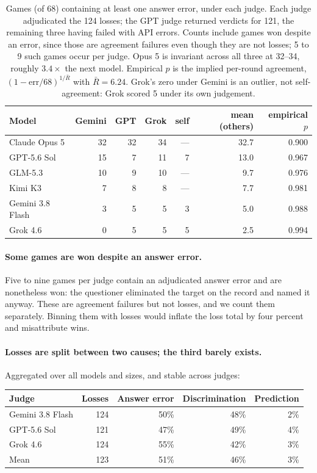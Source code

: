 \documentclass[11pt]{article}
\begin{document}
\begin{table}[h]
\centering\small
\begin{tabular}{lrrrrrr}
\toprule
Model & Gemini & GPT & Grok & self & mean (others) & empirical $p$ \\
\midrule
Claude Opus 5    & 32 & 32 & 34 & --- & 32.7 & 0.900 \\
GPT-5.6 Sol      & 15 &  7 & 11 &  7  & 13.0 & 0.967 \\
GLM-5.3          & 10 &  9 & 10 & --- &  9.7 & 0.976 \\
Kimi K3          &  7 &  8 &  8 & --- &  7.7 & 0.981 \\
Gemini 3.8 Flash &  3 &  5 &  5 &  3  &  5.0 & 0.988 \\
Grok 4.6         &  0 &  5 &  5 &  5  &  2.5 & 0.994 \\
\bottomrule
\end{tabular}
\caption{Games (of 68) containing at least one answer error, under each judge.
Each judge adjudicated the 124 losses; the GPT judge returned verdicts for 121,
the remaining three having failed with API errors.
Counts include games won despite an error, since those are agreement failures
even though they are not losses; 5 to 9 such games occur per judge. Opus 5 is
invariant across all three at 32--34, roughly $3.4\times$ the next model.
Empirical $p$ is the implied per-round agreement,
$(1-\text{err}/68)^{1/\bar{R}}$ with $\bar{R}=6.24$. Grok's zero under Gemini is
an outlier, not self-agreement: Grok scored 5 under its own judgement.}
\end{table}

\paragraph{Some games are won despite an answer error.} Five to nine games per
judge contain an adjudicated answer error and are nonetheless won: the
questioner eliminated the target on the record and named it anyway. These are
agreement failures but not losses, and we count them separately. Binning them
with losses would inflate the
loss total by four percent and misattribute wins.

\paragraph{Losses are split between two causes; the third barely exists.}
Aggregated over all models and sizes, and stable across judges:

\begin{center}\small
\begin{tabular}{lrrrr}
\toprule
Judge & Losses & Answer error & Discrimination & Prediction \\
\midrule
Gemini 3.8 Flash & 124 & 50\% & 48\% & 2\% \\
GPT-5.6 Sol      & 121 & 47\% & 49\% & 4\% \\
Grok 4.6         & 124 & 55\% & 42\% & 3\% \\
\midrule
Mean             & 123 & 51\% & 46\% & 3\% \\
\bottomrule
\end{tabular}
\end{center}
\end{document}
